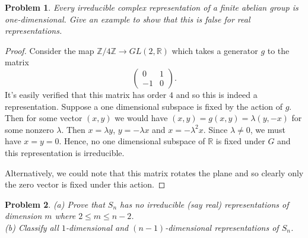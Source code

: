\documentclass{article}
\newtheorem{problem}{Problem}
\begin{document}
\begin{problem}
Every irreducible complex representation of a finite abelian group is one-dimensional. Give an example to show that this is false for real representations.
\end{problem}
\begin{proof}
Consider the map $\mathbb{Z}/4\mathbb{Z} \to GL(2, \mathbb{R})$ which takes a generator $g$ to the matrix
\[
\left (
\begin{array}{cc}
0 & 1\\
-1 & 0
\end{array}
\right ).
\]
It's easily verified that this matrix has order $4$ and so this is indeed a representation. Suppose a one dimensional subspace is fixed by the action of $g$. Then for some vector $(x,y)$ we would have $(x,y) = g(x,y) = \lambda (y,-x)$ for some nonzero $\lambda$. Then $x = \lambda y$, $y = -\lambda x$ and $x = -\lambda^2 x$. Since $\lambda \neq 0$, we must have $x = y = 0$. Hence, no one dimensional subspace of $\mathbb{R}$ is fixed under $G$ and this representation is irreducible.

Alternatively, we could note that this matrix rotates the plane and so clearly only the zero vector is fixed under this action.
\end{proof}

\begin{problem}
(a) Prove that $S_n$ has no irreducible (say real) representations of dimension $m$ where $2 \leq m \leq n-2$.\\
(b) Classify all $1$-dimensional and $(n-1)$-dimensional representations of $S_n$.
\end{problem}
\end{document}
